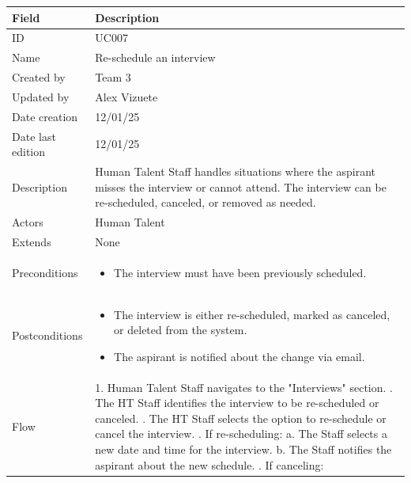 \documentclass{scrreprt}
\begin{document}
\begin{table}[H]
	\centering
	\begin{tabular}{|p{3cm}|p{10cm}|}
		\hline
		\textbf{Field} & \textbf{Description} \\ \hline
		ID & UC007 \\ \hline
		Name & Re-schedule an interview \\ \hline
		Created by & Team 3 \\ \hline
		Updated by & Alex Vizuete \\ \hline
		Date creation & 12/01/25 \\ \hline
		Date last edition & 12/01/25 \\ \hline
		Description & Human Talent Staff handles situations where the aspirant misses the interview or cannot attend. The interview can be re-scheduled, canceled, or removed as needed. \\ \hline
		Actors & Human Talent \\ \hline
		Extends & None \\ \hline
		Preconditions & 
		\begin{itemize}
			\item The interview must have been previously scheduled.
		\end{itemize} \\ \hline
		Postconditions & 
		\begin{itemize}
			\item The interview is either re-scheduled, marked as canceled, or deleted from the system.
			\item The aspirant is notified about the change via email. 
		\end{itemize} \\ \hline
		Flow & 
		1. Human Talent Staff navigates to the "Interviews" section. \newline
		2. The HT Staff identifies the interview to be re-scheduled or canceled. \newline
		3. The HT Staff selects the option to re-schedule or cancel the interview. \newline
		4. If re-scheduling: \newline
		\hspace*{0.5cm} a. The Staff selects a new date and time for the interview. \newline
		\hspace*{0.5cm} b. The Staff notifies the aspirant about the new schedule. \newline
		5. If canceling: \newline

\end{tabular}
\end{table}
\end{document}
